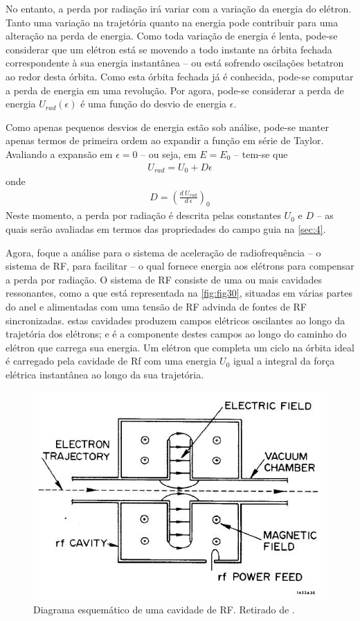 No entanto, a perda por radiação irá variar com a variação da energia do elétron. Tanto uma variação na trajetória quanto na energia pode contribuir para uma alteração na perda de energia. Como toda variação de energia é lenta, pode-se considerar que um elétron está se movendo a todo instante na órbita fechada correspondente à sua energia instantânea -- ou está sofrendo oscilações betatron ao redor desta órbita. Como esta órbita fechada já é conhecida, pode-se computar a perda de energia em uma revolução. Por agora, pode-se considerar a perda de energia $U_{rad}(\epsilon)$ é uma função do desvio de energia $\epsilon$.

Como apenas pequenos desvios de energia estão sob análise, pode-se manter apenas termos de primeira ordem ao expandir a função em série de Taylor. Avaliando a expansão em $\epsilon=0$ -- ou seja, em $E=E_0$ -- tem-se que
\begin{align}
	U_{rad} = U_0 + D\epsilon
\end{align}
onde
\begin{align}
	D = \left(\frac{d\ U_{rad}}{d\ \epsilon}\right)_0
\end{align}
Neste momento, a perda por radiação é descrita pelas constantes $U_0$ e $D$ -- as quais serão avaliadas em termos das propriedades do campo guia na \autoref{sec:4}.

Agora, foque a análise para o sistema de aceleração de radiofrequência -- o sistema de RF, para facilitar -- o qual fornece energia aos elétrons para compensar a perda por radiação. O sistema de RF consiste de uma ou mais cavidades ressonantes, como a que está representada na \autoref{fig:fig30}, situadas em várias partes do anel e alimentadas com uma tensão de RF advinda de fontes de RF sincronizadas. estas cavidades produzem campos elétricos oscilantes ao longo da trajetória dos elétrons; e é a componente destes campos ao longo do caminho do elétron que carrega sua energia. Um elétron que completa um ciclo na órbita ideal é carregado pela cavidade de Rf com uma energia $U_0$ igual a integral da força elétrica instantânea ao longo da sua trajetória.

\begin{figure}[!htb]
	\centering
	\includegraphics[width=0.7\linewidth]{./Figuras/fig30.jpeg}
	\caption{Diagrama esquemático de uma cavidade de RF. Retirado de \cite{sands1970physics}.}
	\label{fig:fig30}
\end{figure}

